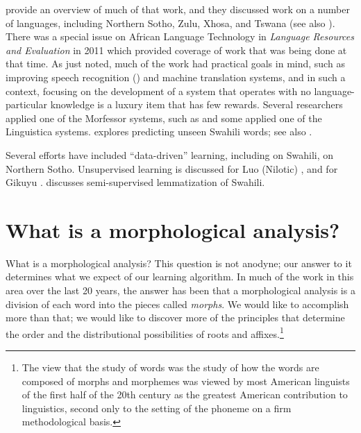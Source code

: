 \documentclass[output=paper,colorlinks,citecolor=brown]{langscibook}
\begin{document}
 \cite{DePaude2008improving} provide an overview of much of that work, and they discussed work on a number of languages, including Northern Sotho, Zulu, Xhosa, and Tswana (see also \cite{DePauwEtAl2009}). There was a special issue on African Language Technology in \textit{Language Resources and Evaluation} in 2011 which provided coverage of work that was being done at that time.  As just noted, much of the work had practical goals in mind, such as improving speech recognition (\cite{GelasEtAl2012}) and machine translation systems, and in such a context, focusing on the development of a system that operates with no language-particular knowledge is a luxury item that has few rewards. Several researchers applied one of the Morfessor systems, such as \citet{GelasEtAl2012} and some applied one of the Linguistica systems.  \cite{Linden2008} explores predicting unseen Swahili words; see also \cite{Muhirwe2007}.

 


Several efforts have included ``data-driven'' learning, including  \cite{DePauwEtAl2006} on Swahili, \cite{DeSchryverDePauw2007} on  Northern Sotho. Unsupervised learning is discussed for  Luo (Nilotic) \cite{de2007unsupervised},  and for Gikuyu \cite{DePauwWagacha2007}. \cite{Linden2008} discusses semi-supervised lemmatization of Swahili.
   

\section{What is a morphological analysis?}

What is a morphological analysis? This question is not anodyne; our answer to it determines what we expect of our learning algorithm. In much of the work in this area over the last 20 years, the answer has been that a morphological analysis is a division of each word into the pieces called \textit{morphs}. We would like to accomplish more than that; we would like to discover more of the principles that determine the order and the distributional possibilities of roots and affixes.\footnote{The view that the study of words was the study of how the words are composed of morphs and morphemes was viewed by most American linguists of the first half of the 20th century as the greatest American contribution to linguistics, second only to the setting of the phoneme on a firm methodological basis.}  
\end{document}
